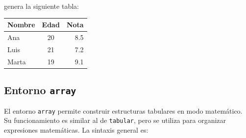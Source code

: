 \documentclass[11pt,a4paper]{article}
\theoremstyle{plain}
\theoremstyle{definition}
\theoremstyle{remark}
\theoremstyle{exercise}
\begin{document}
\noindent genera la siguiente tabla:

\begin{paginarecuadrada}
\begin{center}
    \begin{tabular}{|l|c|r|}
        \hline
        Nombre & Edad & Nota \\ \hline
        Ana & 20 & 8.5 \\
        Luis & 21 & 7.2 \\
        Marta & 19 & 9.1 \\ \hline
    \end{tabular}
\end{center}
\end{paginarecuadrada}

\medskip

%
%
%

\subsection{Entorno \texttt{array}}

El entorno \verb|array| permite construir estructuras tabulares en modo matemático. Su funcionamiento es similar al de \verb|tabular|, pero se utiliza para organizar expresiones matemáticas. La sintaxis general es:
\end{document}
